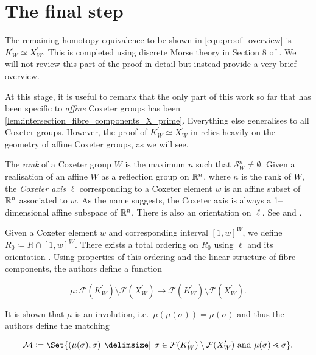 \documentclass[class=article, crop=false]{standalone}
\begin{document}
\section{The final step}
The remaining homotopy equivalence to be shown in \eqref{eqn:proof_overview} is $K^\prime_W \simeq X^\prime_W$. This is completed using discrete Morse theory in Section 8 of \cite{paolini_salvetti_kpi1_2021}. We will not review this part of the proof in detail but instead provide a very brief overview.

At this stage, it is useful to remark that the only part of this work so far that has been specific to \emph{affine} Coxeter groups has been \cref{lem:intersection_fibre_components_X_prime}. Everything else generalises to all Coxeter groups. However, the proof of $K_W^\prime \simeq X^\prime_W$ in \cite{paolini_salvetti_kpi1_2021} relies heavily on the geometry of affine Coxeter groups, as we will see.

The \emph{rank} of a Coxeter group $W$ is the maximum $n$ such that $\mathcal{S}^n_W \neq \emptyset$. Given a realisation of an affine $W$ as a reflection group on $\mathbb{R}^n$, where $n$ is the rank of $W$, the \emph{Coxeter axis} $\ell$ corresponding to a Coxeter element $w$ is an affine subset of $\mathbb{R}^n$ associated to $w$. As the name suggests, the Coxeter axis is always a 1--dimensional affine subspace of $\mathbb{R}^n$. There is also an orientation on $\ell$. See \cite[Section 4]{paolini_salvetti_kpi1_2021} and \cite[Section 7]{mccammond_dual_2015}.

Given a Coxeter element $w$ and corresponding interval $[1,w]^W$, we define $R_0 \coloneq R \cap [1,w]^W$. There exists a total ordering on $R_0$ using $\ell$ and its orientation \cite[Definition 4.10]{paolini_salvetti_kpi1_2021}. Using properties of this ordering and the linear structure of fibre components, the authors define a function 

\begin{equation*}
    \mu \colon \mathcal{F}(K_W^\prime)\setminus\mathcal{F}(X_W^\prime) \to \mathcal{F}(K_W^\prime)\setminus\mathcal{F}(X_W^\prime) .
\end{equation*}

It is shown that $\mu$ is an involution, i.e.~$\mu(\mu(\sigma)) = \mu(\sigma)$ and thus the authors define the matching

\begin{equation*}
    \mathcal{M} \coloneq \Set{(\mu(\sigma), \sigma) \given \sigma \in \mathcal{F}(K_W^\prime)\setminus\mathcal{F}(X_W^\prime) \text{ and } \mu(\sigma) \lessdot \sigma}.
\end{equation*}
\end{document}
